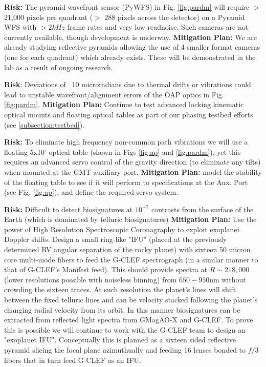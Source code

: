 \documentclass[12pt,preprint]{aastex}
\begin{document}
\textbf{Risk:} The pyramid wavefront sensor (PyWFS) in Fig. \ref{fig:pardm} will require $>$ 21,000 pixels per quadrant ($>$ 288 pixels across the detector) on a Pyramid WFS with $>2kHz$ frame rates and very low readnoise.  Such cameras are not currently available, though development is underway. \textbf{Mitigation Plan:}  We are already studying reflective pyramids allowing the use of 4 smaller format cameras (one for each quadrant) which already exists. These will be demonstrated in the lab as a result of ongoing research.

\textbf{Risk}: Deviations of ~10 microradians due to thermal drifts or vibrations could lead to unstable wavefront/alignment errors of the OAP optics in Fig. \ref{fig:pardm}. \textbf{Mitigation Plan:} Continue to test advanced locking kinematic optical mounts and floating optical tables as part of our phasing testbed efforts (see \ref{subsection:testbed}).

\textbf{Risk:} To eliminate high frequency non-common path vibrations we will use a floating 5x10' optical table (shown in Figs \ref{fig:ap} and \ref{fig:pardm}), yet this requires an advanced servo control of the gravity direction (to eliminate any tilts) when mounted at the GMT auxiliary port. \textbf{Mitigation Plan:} model the stability of the floating table to see if it will perform to specifications at the Aux. Port (see Fig. \ref{fig:ap}), and define the required servo system.

\textbf{Risk:} Difficult to detect biosignatures at $10^{-7}$ contrasts from the surface of the Earth (which is dominated by telluric biosignatures) \textbf{Mitigation Plan:} Use the power of High Resolution Spectroscopic Coronagraphy to exploit exoplanet Doppler shifts. Design a small ring-like "IFU" (placed at the previously determined RV angular separation of the rocky planet) with sixteen 50 micron core multi-mode fibers to feed the G-CLEF spectrograph (in a similar manner to that of G-CLEF’s Manifest feed). This should provide spectra at $R\sim218,000$ (lower resolutions possible with noiseless binning) from  $650-950$nm without crowding the sixteen traces. At such resolution the planet’s lines will shift between the fixed telluric lines and can be velocity stacked following the planet’s changing radial velocity from its orbit. In this manner biosignatures can be extracted from reflected light spectra from GMagAO-X and G-CLEF. To prove this is possible we will continue to work with the G-CLEF team to design an "exoplanet IFU". Conceptually this is planned as a sixteen sided reflective pyramid slicing the focal plane azimuthually and feeding 16 lenses bonded to $f/3$ fibers that in turn feed G-CLEF as an IFU. 
\end{document}
